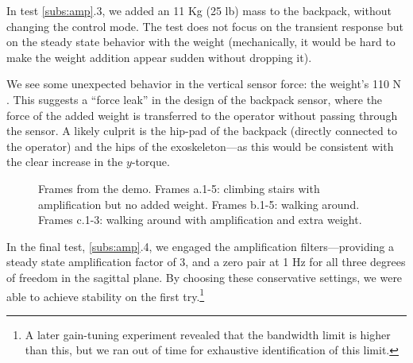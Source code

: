 In test \ref{subs:amp}.3, we added an 11 Kg (25 lb) mass to the backpack, without changing the control mode.  The test does not focus on the transient response but on the steady state behavior with the weight (mechanically, it would be hard to make the weight addition appear sudden without dropping it).

We see some unexpected behavior in the vertical sensor force: the weight's 110 N .  This suggests a ``force leak'' in the design of the backpack sensor, where the force of the added weight is transferred to the operator without passing through the sensor. A likely culprit is the hip-pad of the backpack (directly connected to the operator) and the hips of the exoskeleton---as this would be consistent with the clear increase in the $y$-torque. 

\begin{figure}[t]%
	\centering\footnotesize
	\resizebox{.9\textwidth}{!}{}
	\caption{Frames from the demo. Frames a.1-5: climbing stairs with amplification but no added weight. Frames b.1-5: walking around. Frames c.1-3: walking around with amplification and extra weight.}\label{fig:demo}
\end{figure}

In the final test, \ref{subs:amp}.4, we engaged the amplification filters---providing a steady state amplification factor of 3, and a zero pair at 1 Hz for all three degrees of freedom in the sagittal plane.
By choosing these conservative settings, we were able to achieve stability on the first try.\footnote{A later gain-tuning experiment revealed that the bandwidth limit is higher than this, but we ran out of time for exhaustive identification of this limit.}

